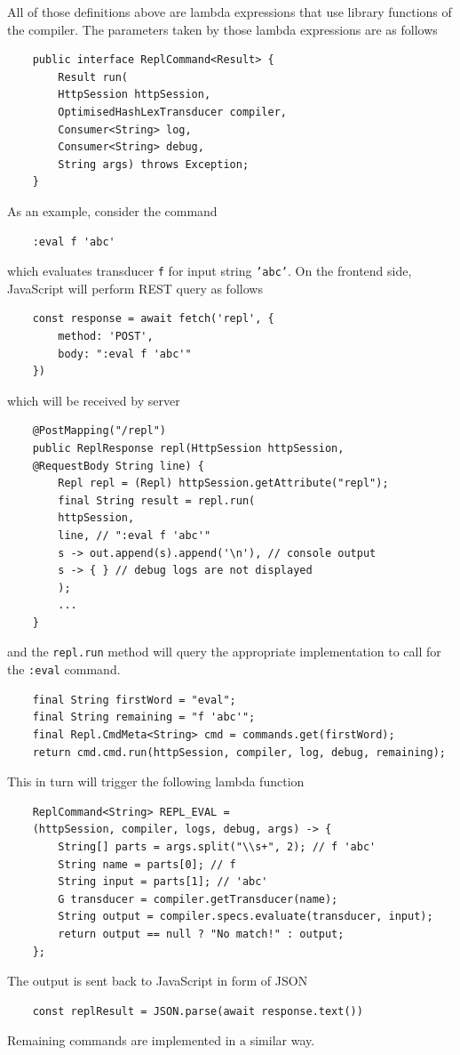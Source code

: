 All of those definitions above are lambda expressions that use library functions
of the compiler. The parameters taken by those lambda expressions are as follows
\begin{lstlisting}
	public interface ReplCommand<Result> {
		Result run(
		HttpSession httpSession, 
		OptimisedHashLexTransducer compiler, 
		Consumer<String> log, 
		Consumer<String> debug, 
		String args) throws Exception;
	}
\end{lstlisting}
As an example, consider the command 
\begin{lstlisting}
	:eval f 'abc'
\end{lstlisting}
which evaluates transducer   \texttt{f} for input string    \texttt{'abc'}. 
On the frontend side, JavaScript will perform REST query as follows
\begin{lstlisting}
	const response = await fetch('repl', {
		method: 'POST',
		body: ":eval f 'abc'"
	})
\end{lstlisting}
which will be received by server
\begin{lstlisting}
	@PostMapping("/repl")
	public ReplResponse repl(HttpSession httpSession, 
	@RequestBody String line) {
		Repl repl = (Repl) httpSession.getAttribute("repl");
		final String result = repl.run(
		httpSession, 
		line, // ":eval f 'abc'"
		s -> out.append(s).append('\n'), // console output
		s -> { } // debug logs are not displayed
		);
		...
	}
\end{lstlisting}
and the     \texttt{repl.run} method will query the appropriate implementation to call for
the     \texttt{:eval} command.
\begin{lstlisting}     
	final String firstWord = "eval";
	final String remaining = "f 'abc'";
	final Repl.CmdMeta<String> cmd = commands.get(firstWord);
	return cmd.cmd.run(httpSession, compiler, log, debug, remaining);
\end{lstlisting}
This in turn will trigger the following lambda function
\begin{lstlisting}
	ReplCommand<String> REPL_EVAL = 
	(httpSession, compiler, logs, debug, args) -> {
		String[] parts = args.split("\\s+", 2); // f 'abc'
		String name = parts[0]; // f
		String input = parts[1]; // 'abc'
		G transducer = compiler.getTransducer(name);
		String output = compiler.specs.evaluate(transducer, input);
		return output == null ? "No match!" : output;
	};
\end{lstlisting}
The output is sent back to JavaScript in form of JSON
\begin{lstlisting}
	const replResult = JSON.parse(await response.text())
\end{lstlisting}
Remaining commands are implemented in a similar way.

